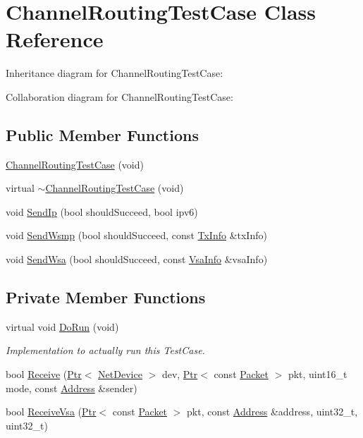 \hypertarget{classChannelRoutingTestCase}{}\section{Channel\+Routing\+Test\+Case Class Reference}
\label{classChannelRoutingTestCase}


Inheritance diagram for Channel\+Routing\+Test\+Case\+:


Collaboration diagram for Channel\+Routing\+Test\+Case\+:
\subsection*{Public Member Functions}
\begin{DoxyCompactItemize}
\item 
\hyperlink{classChannelRoutingTestCase_aa56cf25938a514c40ddd1ab5a0ea942b}{Channel\+Routing\+Test\+Case} (void)
\item 
virtual \hyperlink{classChannelRoutingTestCase_a3bf4bd0c7ee48315e98629cdf01b08ac}{$\sim$\+Channel\+Routing\+Test\+Case} (void)
\item 
void \hyperlink{classChannelRoutingTestCase_a2d9149c5bd4732d6d7d8d768bf3a0da1}{Send\+Ip} (bool should\+Succeed, bool ipv6)
\item 
void \hyperlink{classChannelRoutingTestCase_a229a780a8f247ce4c37e164f204fbefe}{Send\+Wsmp} (bool should\+Succeed, const \hyperlink{structns3_1_1TxInfo}{Tx\+Info} \&tx\+Info)
\item 
void \hyperlink{classChannelRoutingTestCase_a1489eb9505d13948307ce4119ba21cc9}{Send\+Wsa} (bool should\+Succeed, const \hyperlink{structns3_1_1VsaInfo}{Vsa\+Info} \&vsa\+Info)
\end{DoxyCompactItemize}
\subsection*{Private Member Functions}
\begin{DoxyCompactItemize}
\item 
virtual void \hyperlink{classChannelRoutingTestCase_ab0f86da402dbe311e3ebb5915ffe7e85}{Do\+Run} (void)
\begin{DoxyCompactList}\small\item\em Implementation to actually run this Test\+Case. \end{DoxyCompactList}\item 
bool \hyperlink{classChannelRoutingTestCase_ab44b40713e59e465d33e38f7cb473267}{Receive} (\hyperlink{classns3_1_1Ptr}{Ptr}$<$ \hyperlink{classns3_1_1NetDevice}{Net\+Device} $>$ dev, \hyperlink{classns3_1_1Ptr}{Ptr}$<$ const \hyperlink{classns3_1_1Packet}{Packet} $>$ pkt, uint16\+\_\+t mode, const \hyperlink{classns3_1_1Address}{Address} \&sender)
\item 
bool \hyperlink{classChannelRoutingTestCase_a890f36134c856c5790acd79a0a5644b3}{Receive\+Vsa} (\hyperlink{classns3_1_1Ptr}{Ptr}$<$ const \hyperlink{classns3_1_1Packet}{Packet} $>$ pkt, const \hyperlink{classns3_1_1Address}{Address} \&address, uint32\+\_\+t, uint32\+\_\+t)
\end{DoxyCompactItemize}
